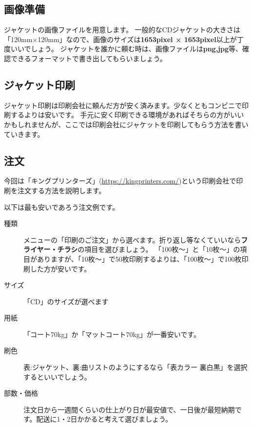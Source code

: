 \documentclass[11pt,a4paper]{jsarticle}
\begin{document}
        \subsection{画像準備}
            ジャケットの画像ファイルを用意します。
            一般的なCDジャケットの大きさは「120mm×120mm」なので、画像のサイズは{\bf 1653pixel × 1653pixel}以上が丁度いいでしょう。
            ジャケットを誰かに頼む時は、画像ファイルは{\bf png,jpg}等、確認できるフォーマットで書き出してもらいましょう。

        \subsection{ジャケット印刷}
            ジャケット印刷は印刷会社に頼んだ方が安く済みます。少なくともコンビニで印刷するよりは安いです。
            手元に安く印刷できる環境があればそちらの方がいいかもしれませんが、ここでは印刷会社にジャケットを印刷してもらう方法を書いていきます。

            \subsection{注文}
                今回は「キングプリンターズ」(\url{https://kingprinters.com/})という印刷会社で印刷を注文する方法を説明します。

                以下は最も安いであろう注文例です。
                \begin{description}
                    \item[種類] メニューの「印刷のご注文」から選べます。折り返し等なくていいなら{\bf フライヤー・チラシ}の項目を選びましょう。
                                「100枚～」と「10枚～」の項目がありますが、「10枚～」で50枚印刷するよりは、「100枚～」で100枚印刷した方が安いです。
                    \item[サイズ] 「CD」のサイズが選べます
                    \item[用紙] 「コート70kg」か「マットコート70kg」が一番安いです。
                    \item[刷色] 表:ジャケット、裏:曲リストのようにするなら「表カラー 裏白黒」を選択するといいでしょう。
                    \item[部数・価格] 注文日から一週間くらいの仕上がり日が最安値で、一日後が最短納期です。配送に1・2日かかると考えて選びましょう。  
                \end{description}
\end{document}
